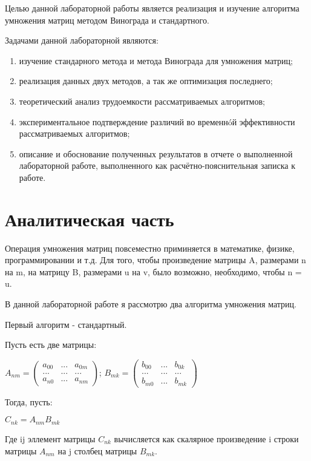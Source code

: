 \documentclass[12pt]{report}
\begin{document}
Целью данной лабораторной работы является реализация и изучение алгоритма умножения матриц методом Винограда и стандартного.

Задачами данной лабораторной являются:
\begin{enumerate}
	\item изучение стандарного метода и метода Винограда для умножения матриц;
	\item реализация данных двух методов, а так же оптимизация последнего;
	\item теоретический анализ трудоемкости рассматриваемых алгоритмов;
	\item экспериментальное подтверждение различий во временнóй эффективности рассматриваемых алгоритмов;
	\item описание и обоснование полученных результатов в отчете о выполненной лабораторной
работе, выполненного как расчётно-пояснительная записка к работе.
\end{enumerate}

\chapter{Аналитическая часть}
Операция умножения матриц повсеместно приминяется в математике, физике, программировании и т.д.
Для того, чтобы произведение матрицы A, размерами n на m, на матрицу B, размерами u на v, было возможно, необходимо, чтобы n = u.

В данной лабораторной работе я рассмотрю два алгоритма умножения матриц.

Первый алгоритм - стандартный. 

Пусть есть две матрицы: 
\begin{center}
{$
A_{nm} = 
\begin{pmatrix}
  a_{00} &  ... & a_{0m}\\
   ... & ... & ...\\
  a_{n0} &  ... &  a_{nm}
\end{pmatrix}
$};
{$
B_{mk} = 
\begin{pmatrix}
  b_{00} &  ... & b_{0k}\\
   ... & ... & ...\\
  b_{m0} &  ... &  b_{mk}
\end{pmatrix}
$}
\end{center}

Тогда, пусть:
\begin{center}
{$
C_{nk} = A_{nm}B_{mk}
$} 
\end{center}
Где ij эллемент матрицы {$C_{nk}$} вычисляется как скалярное произведение i строки матрицы  {$A_{nm}$} на j столбец матрицы {$B_{mk}$}.
\end{document}
